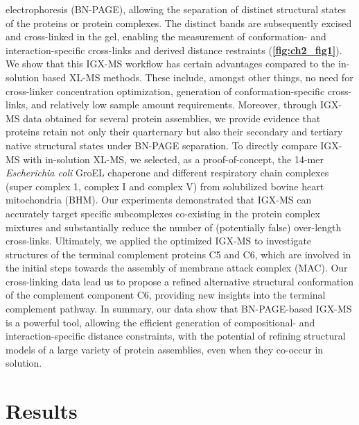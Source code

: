 electrophoresis (BN-PAGE), allowing the separation of distinct structural states of the proteins or protein complexes. The distinct bands are subsequently excised and cross-linked in the gel, enabling the measurement of conformation- and interaction-specific cross-links and derived distance restraints (\textbf{\autoref{fig:ch2_fig1}}). We show that this IGX-MS workflow has certain advantages compared to the in-solution based XL-MS methods. These include, amongst other things, no need for cross-linker concentration optimization, generation of conformation-specific cross-links, and relatively low sample amount requirements. Moreover, through IGX-MS data obtained for several protein assemblies, we provide evidence that proteins retain not only their quarternary but also their secondary and tertiary native structural states under BN-PAGE separation. To directly compare IGX-MS with in-solution XL-MS, we selected, as a proof-of-concept, the 14-mer \emph{Escherichia coli} GroEL chaperone and different respiratory chain complexes (super complex 1, complex I and complex V) from solubilized bovine heart mitochondria (BHM). Our experiments demonstrated that IGX-MS can accurately target specific subcomplexes co-existing in the protein complex mixtures and substantially reduce the number of (potentially false) over-length cross-links. Ultimately, we applied the optimized IGX-MS to investigate structures of the terminal complement proteins C5 and C6, which are involved in the initial steps towards the assembly of membrane attack complex (MAC). Our cross-linking data lead us to propose a refined alternative structural conformation of the complement component C6, providing new insights into the terminal complement pathway. In summary, our data show that BN-PAGE-based IGX-MS is a powerful tool, allowing the efficient generation of compositional- and interaction-specific distance constraints, with the potential of refining structural models of a large variety of protein assemblies, even when they co-occur in solution.

\section{Results}
